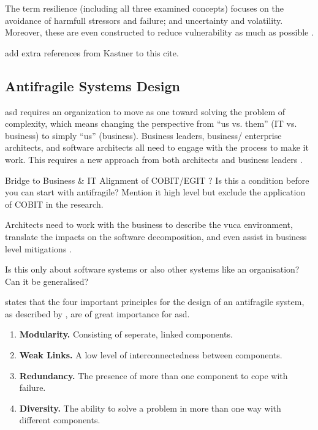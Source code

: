 The term resilience (including all three examined concepts) focuses on the avoidance of harmfull stressors and failure; and uncertainty and volatility. Moreover, these are even constructed to reduce vulnerability as much as possible \parencite{MartinBreen2011}.
\begin{remark}
add extra references from Kastner to this cite.
\end{remark}

\subsection{Antifragile Systems Design}

\acrfull{asd} \parencite[p. 886-888]{OReilly2019} requires an organization to move as one toward solving the problem of complexity, which means changing the perspective from “us vs. them” (IT vs. business) to simply “us” (business). Business leaders, business/ enterprise architects, and software architects all need to engage with the process to make it work. This requires a new approach from both architects and business leaders \parencite[p. 886]{OReilly2019}.

\begin{remark}
	Bridge to Business \& IT Alignment of COBIT/EGIT \parencite{DeHaes2020}? Is this a condition before you can start with antifragile? Mention it high level but exclude the application of COBIT in the research.
\end{remark}

Architects need to work with the business to describe the \acrshort{vuca} environment, translate the impacts on the
software decomposition, and even assist in business level mitigations \parencite[p. 886]{OReilly2019}.

\begin{remark}
	Is this only about software systems or also other systems like an organisation? Can it be generalised?
\end{remark}

\textcite[p. 886]{OReilly2019} states that the four important principles for the design of an \gls{antifragile} system, as described by \textcite[p. 35-39]{Hole2016}, are of great importance for \acrshort{asd}.
\begin{enumerate}
	\item{\textbf{Modularity.} Consisting of seperate, linked components.}
	\item{\textbf{Weak Links.} A low level of interconnectedness between components.}
	\item{\textbf{Redundancy.} The presence of more than one component to cope with failure.}
	\item{\textbf{Diversity.} The ability to solve a problem in more than one way with different components.}
\end{enumerate}

